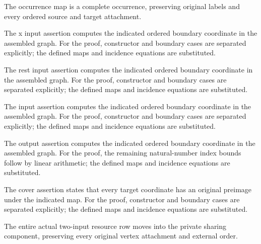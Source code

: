 The occurrence map is a complete occurrence, preserving original labels and every ordered source and target attachment.
\par{}

The x input assertion computes the indicated ordered boundary coordinate in the assembled graph.
For the proof, constructor and boundary cases are separated explicitly; the defined maps and incidence equations are substituted.
\par{}

The rest input assertion computes the indicated ordered boundary coordinate in the assembled graph.
For the proof, constructor and boundary cases are separated explicitly; the defined maps and incidence equations are substituted.
\par{}

The input assertion computes the indicated ordered boundary coordinate in the assembled graph.
For the proof, constructor and boundary cases are separated explicitly; the defined maps and incidence equations are substituted.
\par{}

The output assertion computes the indicated ordered boundary coordinate in the assembled graph.
For the proof, the remaining natural-number index bounds follow by linear arithmetic; the defined maps and incidence equations are substituted.
\par{}

The cover assertion states that every target coordinate has an original preimage under the indicated map.
For the proof, constructor and boundary cases are separated explicitly; the defined maps and incidence equations are substituted.
\par{}

The entire actual two-input resource row moves into the private sharing component, preserving every original vertex attachment and external order.
\par{}

